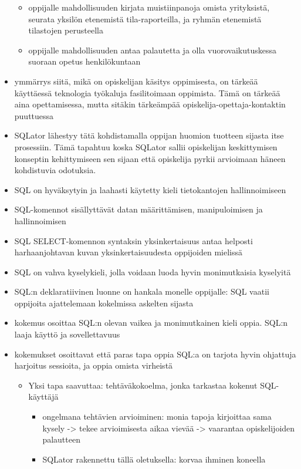 \begin{itemize}
\begin{itemize}
        \item oppijalle mahdollisuuden kirjata muistiinpanoja omista yrityksistä, seurata yksilön etenemistä tila-raporteilla, ja ryhmän etenemistä tilastojen perusteella
        \item oppijalle mahdollisuuden antaa palautetta ja olla vuorovaikutuskessa suoraan opetus henkilökuntaan
    \end{itemize}
    \item ymmärrys siitä, mikä on opiskelijan käsitys oppimisesta, on tärkeää käyttäessä teknologia työkaluja fasilitoimaan oppimista. Tämä on tärkeää aina opettamisessa, mutta sitäkin tärkeämpää opiskelija-opettaja-kontaktin puuttuessa
    \item SQLator lähestyy tätä kohdistamalla oppijan huomion tuotteen sijasta itse prosessiin. Tämä tapahtuu koska SQLator sallii opiskelijan keskittymisen konseptin kehittymiseen sen sijaan että opiskelija pyrkii arvioimaan häneen kohdistuvia odotuksia.
    \item SQL on hyväksytyin ja laahasti käytetty kieli tietokantojen hallinnoimiseen
    \item SQL-komennot sisällyttävät datan määrittämisen, manipuloimisen ja hallinnoimisen
    \item SQL SELECT-komennon syntaksin yksinkertaisuus antaa helposti harhaanjohtavan kuvan yksinkertaisuudesta oppijoiden mielissä
    \item SQL on vahva kyselykieli, jolla voidaan luoda hyvin monimutkaisia kyselyitä
    \item SQL:n deklaratiivinen luonne on hankala monelle oppijalle: SQL vaatii oppijoita ajattelemaan kokelmissa askelten sijasta
    \item kokemus osoittaa SQL:n olevan vaikea ja monimutkainen kieli oppia. SQL:n laaja käyttö ja sovellettavuus 
    \item kokemukset osoittavat että paras tapa oppia SQL:a on tarjota hyvin ohjattuja harjoitus sessioita, ja oppia omista virheistä
    \begin{itemize}
        \item Yksi tapa saavuttaa: tehtäväkokoelma, jonka tarkastaa kokenut SQL-käyttäjä
        \begin{itemize}
            \item ongelmana tehtävien arvioiminen: monia tapoja kirjoittaa sama kysely -> tekee arvioimisesta aikaa vievää -> vaarantaa opiskelijoiden palautteen
            \item SQLator rakennettu tällä oletuksella: korvaa ihminen koneella
        \end{itemize}
    \end{itemize}
    

\end{itemize}
